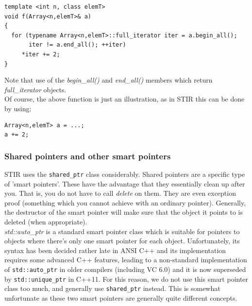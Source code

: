 \documentclass{article}
\begin{document}
\begin{verbatim}
template <int n, class elemT>
void f(Array<n,elemT>& a)
{
  for (typename Array<n,elemT>::full_iterator iter = a.begin_all(); 
       iter != a.end_all(); ++iter)
     *iter += 2;
}
\end{verbatim}

Note that use of the \textit{begin\_all()} and \textit{end\_all()} members 
which return \textit{full\_iterator} objects. \\
Of course, the above function is just an illustration, as in 
STIR this can be done by using:


\begin{verbatim}
Array<n,elemT> a = ...;
a += 2;
\end{verbatim}


\subsubsection{
Shared pointers and other smart pointers \label{sect:sharedptr}}

STIR uses the \texttt{shared\_ptr} class considerably. Shared pointers 
are a specific type of 'smart pointers'. These have the advantage 
that they essentially clean up after you. That is, you do not 
have to call \textit{delete} on them. They are even exception proof 
(something which you cannot achieve with an ordinary pointer). 
Generally, the destructor of the smart pointer will make sure 
that the object it points to is deleted (when appropriate).\\
\textit{std::auto\_ptr} is a standard smart pointer class which is 
suitable for pointers to objects where there's only one smart 
pointer for each object. Unfortunately, its syntax has been decided 
rather late in ANSI C++ and its implementation requires some 
advanced C++ features, leading to a non-standard implementation 
of \texttt{std::auto\_ptr} in older compilers (including VC 6.0) and it is now
superseded by \texttt{std::unique\_ptr} in C++11. For this 
reason, we do not use this smart pointer class too much, and 
generally use \texttt{shared\_ptr} instead. This is somewhat unfortunate 
as these two smart pointers are generally quite different concepts. 
\end{document}
